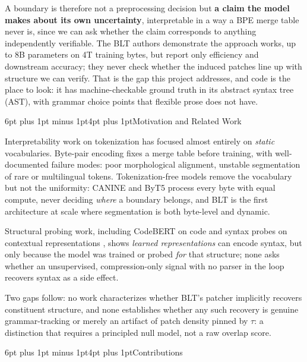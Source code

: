 \documentclass[9pt]{extarticle}
\makeatletter
\renewcommand\section{\@startsection{section}{1}{0pt}%
  {6pt plus 1pt minus 1pt}{4pt plus 1pt}{\normalfont\large\bfseries}}
\makeatother
\begin{document}
A boundary is therefore not a preprocessing decision but \textbf{a claim the
model makes about its own uncertainty}, interpretable in a way a BPE merge
table never is, since we can ask whether the claim corresponds to anything
independently verifiable. The BLT authors demonstrate the approach works, up to
8B parameters on 4T training bytes, but report only efficiency and downstream
accuracy; they never check whether the induced patches line up with structure we
can verify. That is the gap this project addresses, and code is the place to
look: it has machine-checkable ground truth in its abstract syntax tree (AST),
with grammar choice points that flexible prose does not have.

\section{Motivation and Related Work}

Interpretability work on tokenization has focused almost entirely on
\emph{static} vocabularies. Byte-pair encoding \citep{sennrich2016bpe} fixes a
merge table before training, with well-documented failure modes: poor
morphological alignment, unstable segmentation of rare or multilingual tokens.
Tokenization-free models remove the vocabulary but not the uniformity: CANINE
\citep{clark2022canine} and ByT5 \citep{xue2022byt5} process every byte with
equal compute, never deciding \emph{where} a boundary belongs, and BLT is the
first architecture at scale where segmentation is both byte-level and dynamic.

Structural probing work, including CodeBERT \citep{feng2020codebert} on code
and syntax probes on contextual representations \citep{hewitt2019structural},
shows \emph{learned representations} can encode syntax, but only because the
model was trained or probed \emph{for} that structure; none asks whether an
unsupervised, compression-only signal with no parser in the loop recovers
syntax as a side effect.

Two gaps follow: no work characterizes whether BLT's patcher implicitly
recovers constituent structure, and none establishes whether any such recovery
is genuine grammar-tracking or merely an artifact of patch density pinned by
$\tau$: a distinction that requires a principled null model, not a raw
overlap score.

\section{Contributions}
\end{document}
